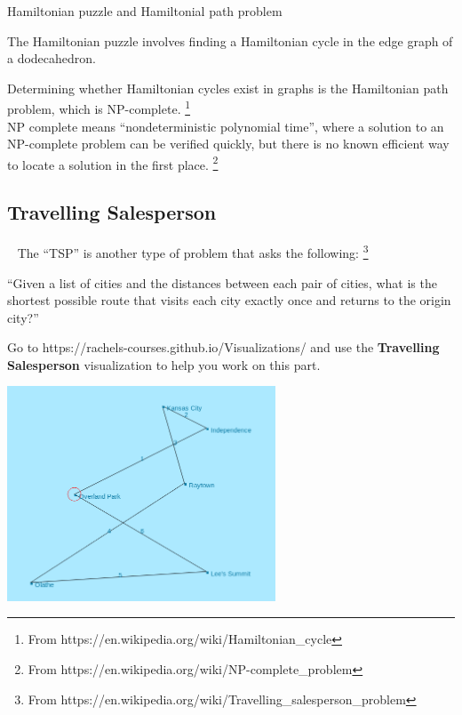     \newpage

        \begin{intro}{Hamiltonian puzzle and Hamiltonial path problem}
            
            The Hamiltonian puzzle involves finding a Hamiltonian cycle
            in the edge graph of a dodecahedron.

            Determining whether Hamiltonian cycles exist in graphs is
            the Hamiltonian path problem, which is NP-complete.
            \footnote{From https://en.wikipedia.org/wiki/Hamiltonian\_cycle}
            ~\\

            NP complete means ``nondeterministic polynomial time'', where
            a solution to an NP-complete problem can be verified quickly,
            but there is no known efficient way to locate a solution
            in the first place.
            \footnote{From https://en.wikipedia.org/wiki/NP-complete\_problem}
        \end{intro}

    \newpage

    \subsection{Travelling Salesperson}

        \begin{intro}{\ }
            The ``TSP'' is another type of problem that asks the following:
            \footnote{From https://en.wikipedia.org/wiki/Travelling\_salesperson\_problem}
            
            \begin{center}
                ``Given a list of cities and the distances between each pair of cities, what is the shortest possible route that visits each city exactly once and returns to the origin city?''
            \end{center}
        \end{intro}

        Go to https://rachels-courses.github.io/Visualizations/ and use the
        \textbf{Travelling Salesperson} visualization to help you work on this part.
        
        \begin{center}
            \includegraphics[width=8cm]{images/7-7-salesperson.png}
        \end{center}

